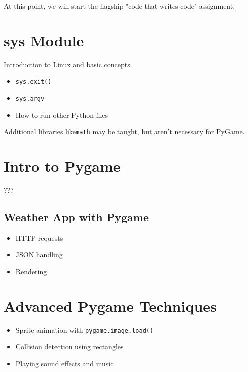 \documentclass{article}
\begin{document}
At this point, we will start the flagship "code that writes code" assignment.

\section{sys Module}

Introduction to Linux and basic concepts.

\begin{itemize}
    \item \verb|sys.exit()|
    \item \verb|sys.argv|
    \item How to run other Python files
\end{itemize}

Additional libraries like\verb|math| may be taught, but aren't necessary for PyGame.

\section{Intro to Pygame}
???

\subsection{Weather App with Pygame}
\begin{itemize}
    \item HTTP requests
    \item JSON handling
    \item Rendering
\end{itemize}

\section{Advanced Pygame Techniques}
\begin{itemize}
    \item Sprite animation with \verb|pygame.image.load()|
    \item Collision detection using rectangles
    \item Playing sound effects and music
\end{itemize}

\end{document}
